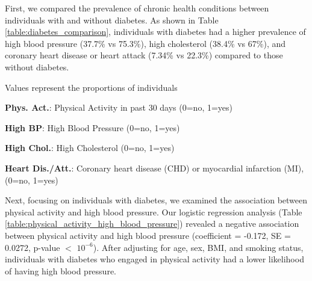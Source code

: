 \documentclass[11pt]{article}
\begin{document}
First, we compared the prevalence of chronic health conditions between individuals with and without diabetes. As shown in Table {}\ref{table:diabetes_comparison}, individuals with diabetes had a higher prevalence of high blood pressure (37.7\% vs 75.3\%), high cholesterol (38.4\% vs 67\%), and coronary heart disease or heart attack (7.34\% vs 22.3\%) compared to those without diabetes.

\begin{table}[h]
\caption{Descriptive Statistics of Physical Activity and Chronic Health Conditions for both Diabetes and Non-Diabetes Individuals}
\label{table:diabetes_comparison}
\begin{threeparttable}
\renewcommand{\TPTminimum}{\linewidth}
\begin{tablenotes}
\footnotesize
\item Values represent the proportions of individuals
\item \textbf{Phys. Act.}: Physical Activity in past 30 days (0=no, 1=yes)
\item \textbf{High BP}: High Blood Pressure (0=no, 1=yes)
\item \textbf{High Chol.}: High Cholesterol (0=no, 1=yes)
\item \textbf{Heart Dis./Att.}: Coronary heart disease (CHD) or myocardial infarction (MI), (0=no, 1=yes)
\end{tablenotes}
\end{threeparttable}
\end{table}


Next, focusing on individuals with diabetes, we examined the association between physical activity and high blood pressure. Our logistic regression analysis (Table {}\ref{table:physical_activity_high_blood_pressure}) revealed a negative association between physical activity and high blood pressure (coefficient = -0.172, SE = 0.0272, p-value $<$ $10^{-6}$). After adjusting for age, sex, BMI, and smoking status, individuals with diabetes who engaged in physical activity had a lower likelihood of having high blood pressure.
\end{document}
